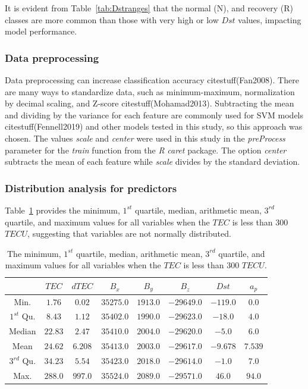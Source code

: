 \let\LaTeXcline\cline\documentclass[sn-mathphys-num]{sn-jnl}\let\cline\LaTeXcline
\begin{document}
It is evident from Table~\ref{tab:Dstranges} that the normal (N), and recovery (R) classes are more common than those with very high or low $Dst$ values, impacting model performance.

\subsubsection{Data preprocessing}

Data preprocessing can increase classification accuracy citestuff(Fan2008). There are many ways to standardize data, such as minimum-maximum, normalization by decimal scaling, and Z-score citestuff(Mohamad2013). Subtracting the mean and dividing by the variance for each feature are commonly used for SVM models citestuff(Fennell2019) and other models tested in this study, so this approach was chosen. The values \textit{scale} and \textit{center} were used in this study in the \textit{preProcess} parameter for the \textit{train} function from the \textit{R} \textit{caret} package. The option \textit{center} subtracts the mean of each feature while \textit{scale} divides by the standard deviation.

\subsubsection{Distribution analysis for predictors}

Table~\ref{tab:minmax} provides the minimum, $1^{st}$ quartile, median, arithmetic mean, $3^{rd}$ quartile, and maximum values for all variables when the $TEC$ is less than $300$ $TECU$, suggesting that variables are not normally distributed.

\begin{table}[!ht]
    \centering
    \caption{The minimum, $1^{st}$ quartile, median, arithmetic mean, $3^{rd}$ quartile, and maximum values for all variables when the $TEC$ is less than $300$ $TECU$.}
    \label{tab:minmax}
        \begin{tabular}{|c|c|c|c|c|c|c|c|}
                \hline
                  & $TEC$ & $dTEC$ & $B_{x}$ & $B_{y}$ & $B_{z}$ & $Dst$ & $a_{p}$ \\ \hline
                Min. & $1.76$ & $0.02$ & $35275.0$ & $1913.0$ & $-29649.0$ & $-119.0$ & $0.0$ \\ \hline
                $1^{st}$ Qu. & $8.43$ & $1.12$ & $35402.0$ & $1990.0$ & $-29623.0$ & $-18.0$ & $4.0$ \\ \hline
                Median & $22.83$ & $2.47$ & $35410.0$ & $2004.0$ & $-29620.0$ & $-5.0$ & $6.0$ \\ \hline
                Mean & $24.62$ & $6.208$ & $35413.0$ & $2003.0$ & $-29617.0$ & $-9.678$ & $7.539$ \\ \hline
                $3^{rd}$ Qu. & $34.23$ & $5.54$ & $35423.0$ & $2018.0$ & $-29614.0$ & $-1.0$ & $7.0$ \\ \hline
                Max. & $288.0$ & $997.0$ & $35524.0$ & $2089.0$ & $-29571.0$ & $46.0$ & $94.0$ \\ \hline
        \end{tabular}
\end{table}
\end{document}
